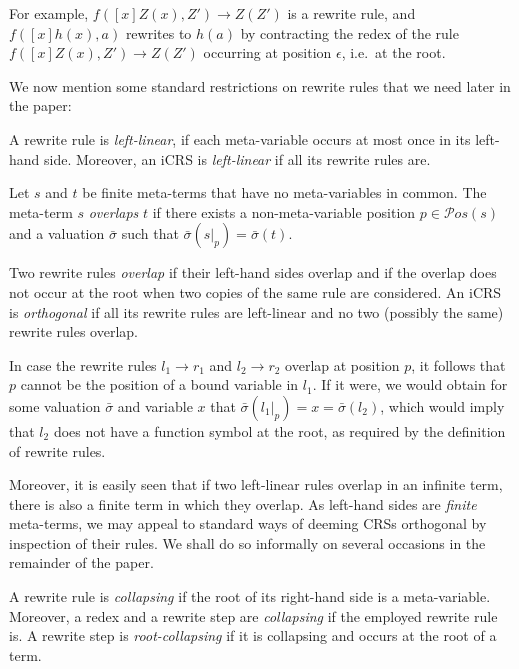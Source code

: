 \documentclass{LMCS}
\theoremstyle{plain}
\theoremstyle{definition}
\newcommand{\rew}{\rightarrow}
\newcommand{\pos}[1]{\mathcal{P}os(#1)}
\begin{document}
For example, $f([x]Z(x),Z') \rightarrow Z(Z')$ is a rewrite rule,
and $f([x]h(x),a)$ rewrites to $h(a)$ by contracting the redex of the rule 
$f([x]Z(x),Z') \rightarrow Z(Z')$ occurring at position $\epsilon$, i.e.\ at the root.

We now mention some standard restrictions on rewrite rules 
that we need later in the paper: 

\begin{defi}
A rewrite rule is \emph{left-linear}, if each meta-variable occurs at
most once in its left-hand side. Moreover, an iCRS is \emph{left-linear}
if all its rewrite rules are.
\end{defi}

\begin{defi}
Let $s$ and $t$ be finite meta-terms that have no meta-variables in common. The meta-term $s$ \emph{overlaps} $t$ if there exists a non-meta-variable position $p \in \pos{s}$ and a valuation $\bar{\sigma}$ such that $\bar{\sigma}(s|_p) = \bar{\sigma}(t)$.

Two rewrite rules \emph{overlap} if their left-hand sides overlap and if the overlap does not occur at the root when two copies of the same rule are considered. An iCRS is \emph{orthogonal} if all its rewrite rules are left-linear and no two (possibly the same) rewrite rules overlap.
\end{defi}

In case the rewrite rules $l_1 \rew r_1$ and $l_2 \rew r_2$ overlap
at position $p$, it follows that $p$ cannot be the position of a
bound variable in $l_1$. If it were, we would obtain for some valuation
$\bar{\sigma}$ and variable $x$ that $\bar{\sigma}(l_1|_p) = x = 
\bar{\sigma}(l_2)$, which would imply that $l_2$ does not have
a function symbol at the root, as required by the definition of
rewrite rules.

Moreover, it is easily seen that if two left-linear rules overlap in an infinite term, there is also a finite term in which they overlap. As left-hand sides are
\emph{finite} meta-terms, we may appeal to standard ways of deeming
CRSs orthogonal by inspection of their rules.
We shall do so informally on several occasions in the
remainder of the paper. 




\begin{defi}
A rewrite rule is \emph{collapsing} if the root of its right-hand side is a meta-variable. 
Moreover, a redex and a rewrite step are \emph{collapsing}
if the employed rewrite rule is. A rewrite step is \emph{root-collapsing}
if it is collapsing and occurs at the root of a term.
\end{defi}
\end{document}
